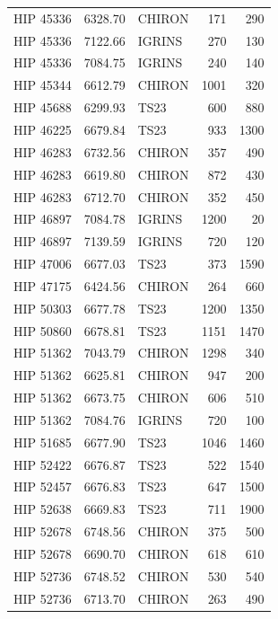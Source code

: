 {\begin{scriptsize}
\begin{longtable}{|l|rlrr|}
   HIP 45336 &  6328.70 &     CHIRON &      171 &   290 \\
   HIP 45336 &  7122.66 &     IGRINS &      270 &   130 \\
   HIP 45336 &  7084.75 &     IGRINS &      240 &   140 \\
   HIP 45344 &  6612.79 &     CHIRON &     1001 &   320 \\
   HIP 45688 &  6299.93 &       TS23 &      600 &   880 \\
   HIP 46225 &  6679.84 &       TS23 &      933 &  1300 \\
   HIP 46283 &  6732.56 &     CHIRON &      357 &   490 \\
   HIP 46283 &  6619.80 &     CHIRON &      872 &   430 \\
   HIP 46283 &  6712.70 &     CHIRON &      352 &   450 \\
   HIP 46897 &  7084.78 &     IGRINS &     1200 &    20 \\
   HIP 46897 &  7139.59 &     IGRINS &      720 &   120 \\
   HIP 47006 &  6677.03 &       TS23 &      373 &  1590 \\
   HIP 47175 &  6424.56 &     CHIRON &      264 &   660 \\
   HIP 50303 &  6677.78 &       TS23 &     1200 &  1350 \\
   HIP 50860 &  6678.81 &       TS23 &     1151 &  1470 \\
   HIP 51362 &  7043.79 &     CHIRON &     1298 &   340 \\
   HIP 51362 &  6625.81 &     CHIRON &      947 &   200 \\
   HIP 51362 &  6673.75 &     CHIRON &      606 &   510 \\
   HIP 51362 &  7084.76 &     IGRINS &      720 &   100 \\
   HIP 51685 &  6677.90 &       TS23 &     1046 &  1460 \\
   HIP 52422 &  6676.87 &       TS23 &      522 &  1540 \\
   HIP 52457 &  6676.83 &       TS23 &      647 &  1500 \\
   HIP 52638 &  6669.83 &       TS23 &      711 &  1900 \\
   HIP 52678 &  6748.56 &     CHIRON &      375 &   500 \\
   HIP 52678 &  6690.70 &     CHIRON &      618 &   610 \\
   HIP 52736 &  6748.52 &     CHIRON &      530 &   540 \\
   HIP 52736 &  6713.70 &     CHIRON &      263 &   490 \\

\end{longtable}
\end{scriptsize}}
